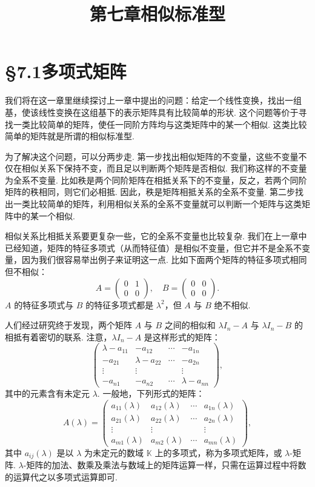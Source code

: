 \documentclass[UTF8, 12pt, fontset=fandol, oneside]{ctexart}
\title{第七章\quad 相似标准型}
\author{}
\date{}
\begin{document}
\maketitle

\section*{§7.1\quad 多项式矩阵}

我们将在这一章里继续探讨上一章中提出的问题：给定一个线性变换，找出一组基，使该线性变换在这组基下的表示矩阵具有比较简单的形状. 这个问题等价于寻找一类比较简单的矩阵，使任一同阶方阵均与这类矩阵中的某一个相似. 这类比较简单的矩阵就是所谓的相似标准型.

为了解决这个问题，可以分两步走. 第一步找出相似矩阵的不变量，这些不变量不仅在相似关系下保持不变，而且足以判断两个矩阵是否相似. 我们称这样的不变量为全系不变量. 比如秩是两个同阶矩阵在相抵关系下的不变量，反之，若两个同阶矩阵的秩相同，则它们必相抵. 因此，秩是矩阵相抵关系的全系不变量. 第二步找出一类比较简单的矩阵，利用相似关系的全系不变量就可以判断一个矩阵与这类矩阵中的某一个相似.

相似关系比相抵关系要更复杂一些，它的全系不变量也比较复杂. 我们在上一章中已经知道，矩阵的特征多项式（从而特征值）是相似不变量，但它并不是全系不变量，因为我们很容易举出例子来证明这一点. 比如下面两个矩阵的特征多项式相同但不相似：
\[
A=\left(\begin{array}{cc}
0 & 1\\
0 & 0
\end{array}\right),\quad
B=\left(\begin{array}{cc}
0 & 0\\
0 & 0
\end{array}\right).
\]
$A$ 的特征多项式与 $B$ 的特征多项式都是 $\lambda^2$，但 $A$ 与 $B$ 绝不相似.

人们经过研究终于发现，两个矩阵 $A$ 与 $B$ 之间的相似和 $\lambda I_n-A$ 与 $\lambda I_n-B$ 的相抵有着密切的联系. 注意，$\lambda I_n-A$ 是这样形式的矩阵：
\[
\left(\begin{array}{cccc}
\lambda-a_{11} & -a_{12} & \cdots & -a_{1n}\\
-a_{21} & \lambda-a_{22} & \cdots & -a_{2n}\\
\vdots & \vdots & & \vdots\\
-a_{n1} & -a_{n2} & \cdots & \lambda-a_{nn}
\end{array}\right),
\]
其中的元素含有未定元 $\lambda$. 一般地，下列形式的矩阵：
\[
A(\lambda)=
\left(\begin{array}{cccc}
a_{11}(\lambda) & a_{12}(\lambda) & \cdots & a_{1n}(\lambda)\\
a_{21}(\lambda) & a_{22}(\lambda) & \cdots & a_{2n}(\lambda)\\
\vdots & \vdots & & \vdots\\
a_{m1}(\lambda) & a_{m2}(\lambda) & \cdots & a_{mn}(\lambda)
\end{array}\right),
\]
其中 $a_{ij}(\lambda)$ 是以 $\lambda$ 为未定元的数域 $\mathbb{K}$ 上的多项式，称为多项式矩阵，或 $\lambda$-矩阵. $\lambda$-矩阵的加法、数乘及乘法与数域上的矩阵运算一样，只需在运算过程中将数的运算代之以多项式运算即可.
\end{document}
